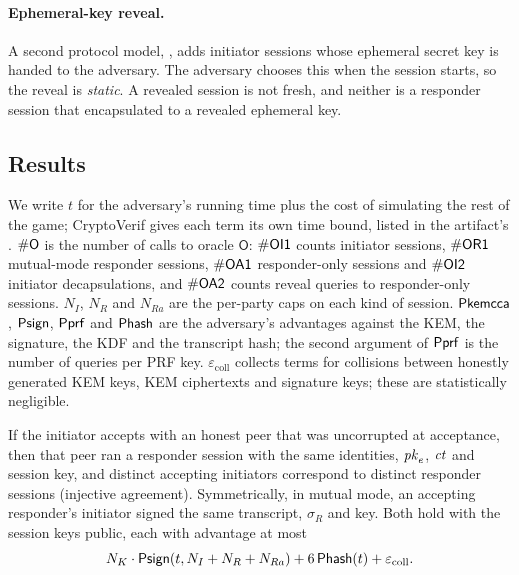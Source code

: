 \paragraph{Ephemeral-key reveal.} A second protocol model,
, adds initiator sessions whose ephemeral
secret key is handed to the adversary. The adversary chooses this when the
session starts, so the reveal is \emph{static}. A revealed session is not
fresh, and neither is a responder session that encapsulated to a revealed
ephemeral key.

\subsection{Results}\label{sec:results}

We write $t$ for the adversary's running time plus the cost of simulating
the rest of the game; CryptoVerif gives each term its own time bound, listed
in the artifact's . $\#\mathsf{O}$ is the number of calls to
oracle $\mathsf{O}$: $\#\mathsf{OI1}$ counts initiator sessions, $\#\mathsf{OR1}$
mutual-mode responder sessions, $\#\mathsf{OA1}$ responder-only sessions and
$\#\mathsf{OI2}$ initiator decapsulations, and $\#\mathsf{OA2}$ counts reveal
queries to responder-only sessions. $N_I$, $N_R$ and $N_{Ra}$ are the
per-party caps on each kind of session. $\mathsf{Pkemcca}$, $\mathsf{Psign}$,
$\mathsf{Pprf}$ and $\mathsf{Phash}$ are the adversary's advantages against the
KEM, the signature, the KDF and the transcript hash; the second argument of
$\mathsf{Pprf}$ is the number of queries per PRF key.
$\varepsilon_{\mathrm{coll}}$ collects terms for collisions between honestly
generated KEM keys, KEM ciphertexts and signature keys; these are
statistically negligible.

\begin{theorem}\label{thm:auth}
If the initiator accepts with an honest peer that was uncorrupted at
acceptance, then that peer ran a responder session with the same identities,
$\mathit{pk}_e$, $\mathit{ct}$ and session key, and distinct accepting initiators correspond to
distinct responder sessions (injective agreement). Symmetrically, in mutual
mode, an accepting responder's initiator signed the same transcript,
$\sigma_R$ and key. Both hold with the session keys public, each with
advantage at most
\[
  N_K \cdot \mathsf{Psign}(t, N_I + N_R + N_{Ra}) + 6\,\mathsf{Phash}(t) + \varepsilon_{\mathrm{coll}}.
\]
\end{theorem}

